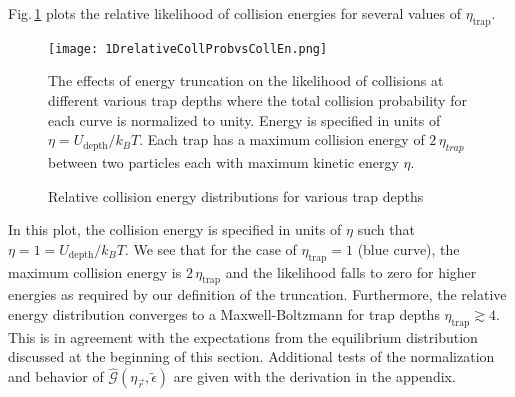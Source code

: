 Fig.\,\ref{fig:relativeCollProb} plots the relative likelihood of collision energies for several values of $\eta_\text{trap}$.
	\begin{figure} 
	\centerline{
	  \texttt{[image: 1DrelativeCollProbvsCollEn.png]}}
	  \caption{Relative collision energy distributions for various trap depths}{The effects of energy truncation on the likelihood of collisions at different various trap depths where the total collision probability for each curve is normalized to unity. Energy is specified in units of $\eta = U_{\text{depth}}/k_B T$. Each trap has a maximum collision energy of $2\,\eta_{trap}$ between two particles each with maximum kinetic energy $\eta$.}
	  \label{fig:relativeCollProb}
	\end{figure}
In this plot, the collision energy is specified in units of $\eta$ such that $\eta=1=U_\text{depth}/k_B T$.
We see that for the case of $\eta_\text{trap}=1$ (blue curve), the maximum collision energy is $2\,\eta_\text{trap}$ and the likelihood falls to zero for higher energies as required by our definition of the truncation.
Furthermore, the relative energy distribution converges to a Maxwell-Boltzmann for trap depths $\eta_\text{trap} \gtrsim 4$.
This is in agreement with the expectations from the equilibrium distribution discussed at the beginning of this section.
Additional tests of the normalization and behavior of $\hat{\mathcal{G}}(\eta_{\vec{r}}, \tilde{\epsilon})$ are given with the derivation in the appendix.

